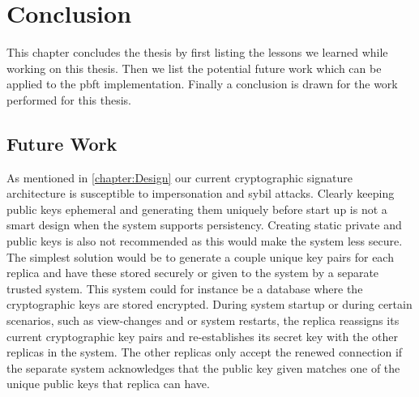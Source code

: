 \chapter{Conclusion}
\label{chapter:Con}
\iffalse
This chapter concludes the thesis by first listing the lessons we learned while working on this thesis. Then we list the potential future work which can be applied to the \ac{pbft} implementation.
Finally a conclusion is drawn for the work performed for this thesis.



\section{Future Work}

As mentioned in \autoref{chapter:Design} our current cryptographic signature architecture is susceptible to impersonation and sybil attacks. Clearly keeping public keys ephemeral and generating them uniquely before start up is not a smart design when the system supports persistency. Creating static private and public keys is also not recommended as this would make the system less secure. The simplest solution would be to generate a couple unique key pairs for each replica and have these stored securely or given to the system by a separate trusted system. This system could for instance be a database where the cryptographic keys are stored encrypted. During system startup or during certain scenarios, such as view-changes and or system restarts, the replica reassigns its current cryptographic key pairs and re-establishes its secret key with the other replicas in the system. The other replicas only accept the renewed connection if the separate system acknowledges that the public key given matches one of the unique public keys that replica can have.

